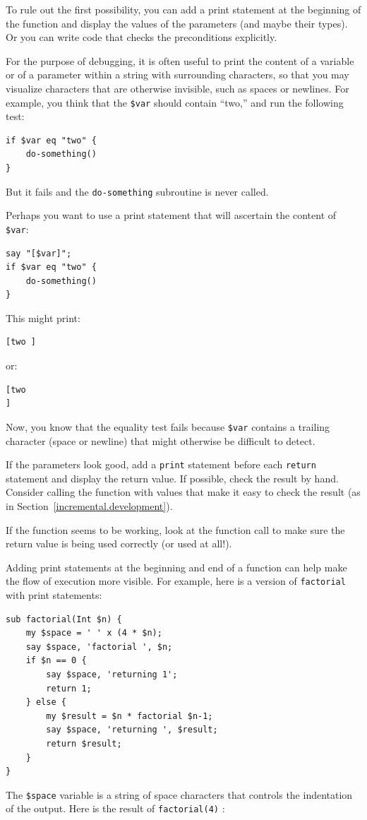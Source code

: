 To rule out the first possibility, you can add a print statement
at the beginning of the function and display the values of the
parameters (and maybe their types).  Or you can write code
that checks the preconditions explicitly.

For the purpose of debugging, it is often useful to print 
the content of a variable or of a parameter within a string 
with surrounding characters, so that you may visualize 
characters that are otherwise invisible, such as spaces or 
newlines. For example, you think that the \verb'$var' should 
contain ``two,'' and run the following test:
\begin{verbatim}
if $var eq "two" {
    do-something()
}
\end{verbatim}
%
But it fails and the {\tt do-something} subroutine is never called.

Perhaps you want to use a print statement that will ascertain 
the content of \verb'$var':
\begin{verbatim}
say "[$var]";
if $var eq "two" {
    do-something()
}
\end{verbatim}
%

This might print:
\begin{verbatim}
[two ]
\end{verbatim}
%

or:
\begin{verbatim}
[two
]
\end{verbatim}
%
Now, you know that the equality test fails because \verb'$var'
contains a trailing character (space or newline) that might otherwise 
be difficult to detect.

If the parameters look good, add a {\tt print} statement before each
{\tt return} statement and display the return value.  If
possible, check the result by hand.  Consider calling the
function with values that make it easy to check the result
(as in Section~\ref{incremental.development}).

If the function seems to be working, look at the function call
to make sure the return value is being used correctly (or used
at all!).

Adding print statements at the beginning and end of a function
can help make the flow of execution more visible.
For example, here is a version of {\tt factorial} with
print statements:

\begin{verbatim}
sub factorial(Int $n) {
    my $space = ' ' x (4 * $n);
    say $space, 'factorial ', $n;
    if $n == 0 {
        say $space, 'returning 1';
        return 1;
    } else {
        my $result = $n * factorial $n-1;
        say $space, 'returning ', $result;
        return $result;
    }
}
\end{verbatim}
%
The {\tt \$space} variable is a string of space characters that controls the
indentation of the output.  Here is the result of {\tt factorial(4)} :

